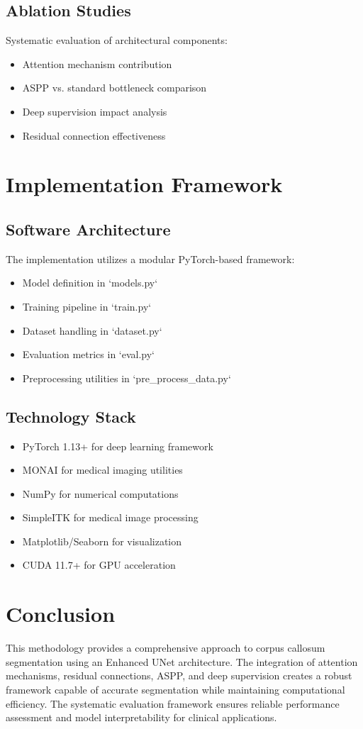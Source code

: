\subsection{Ablation Studies}

Systematic evaluation of architectural components:
\begin{itemize}
\item Attention mechanism contribution
\item ASPP vs. standard bottleneck comparison
\item Deep supervision impact analysis
\item Residual connection effectiveness
\end{itemize}

\section{Implementation Framework}

\subsection{Software Architecture}

The implementation utilizes a modular PyTorch-based framework:
\begin{itemize}
\item Model definition in `models.py`
\item Training pipeline in `train.py`
\item Dataset handling in `dataset.py`
\item Evaluation metrics in `eval.py`
\item Preprocessing utilities in `pre_process_data.py`
\end{itemize}

\subsection{Technology Stack}

\begin{itemize}
\item PyTorch 1.13+ for deep learning framework
\item MONAI for medical imaging utilities
\item NumPy for numerical computations
\item SimpleITK for medical image processing
\item Matplotlib/Seaborn for visualization
\item CUDA 11.7+ for GPU acceleration
\end{itemize}

\section{Conclusion}

This methodology provides a comprehensive approach to corpus callosum segmentation using an Enhanced UNet architecture. The integration of attention mechanisms, residual connections, ASPP, and deep supervision creates a robust framework capable of accurate segmentation while maintaining computational efficiency. The systematic evaluation framework ensures reliable performance assessment and model interpretability for clinical applications. 